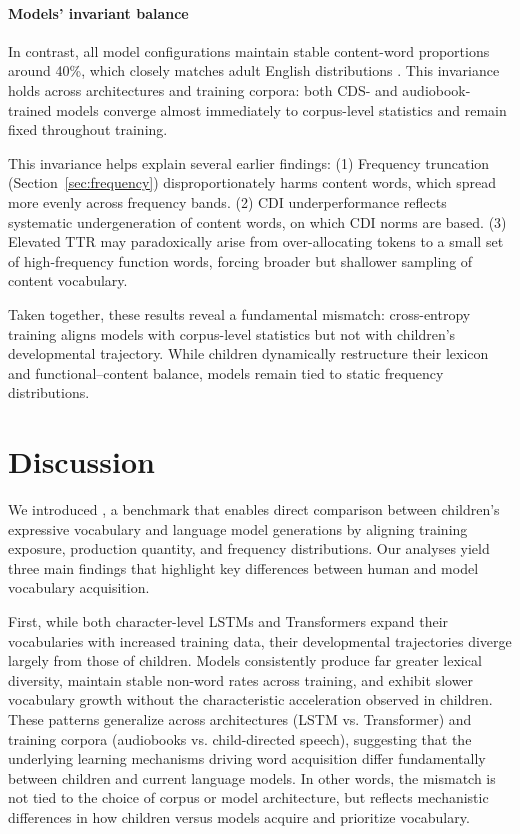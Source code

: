 \paragraph{Models’ invariant balance} 

In contrast, all model configurations maintain stable content-word proportions around 40\%, which closely matches adult English distributions \citep{biber2021grammar}. This invariance holds across architectures and training corpora: both CDS- and audiobook-trained models converge almost immediately to corpus-level statistics and remain fixed throughout training.

This invariance helps explain several earlier findings: (1) Frequency truncation (Section~\ref{sec:frequency}) disproportionately harms content words, which spread more evenly across frequency bands. (2) CDI underperformance reflects systematic undergeneration of content words, on which CDI norms are based. (3) Elevated TTR may paradoxically arise from over-allocating tokens to a small set of high-frequency function words, forcing broader but shallower sampling of content vocabulary.

Taken together, these results reveal a fundamental mismatch: cross-entropy training aligns models with corpus-level statistics but not with children’s developmental trajectory. While children dynamically restructure their lexicon and functional–content balance, models remain tied to static frequency distributions.



\section{Discussion}

We introduced \meCDI{}, a benchmark that enables direct comparison between children’s expressive vocabulary and language model generations by aligning training exposure, production quantity, and frequency distributions. Our analyses yield three main findings that highlight key differences between human and model vocabulary acquisition.


First, while both character-level LSTMs and Transformers expand their vocabularies with increased training data, their developmental trajectories diverge largely from those of children. Models consistently produce far greater lexical diversity, maintain stable non-word rates across training, and exhibit slower vocabulary growth without the characteristic acceleration observed in children. These patterns generalize across architectures (LSTM vs. Transformer) and training corpora (audiobooks vs. child-directed speech), suggesting that the underlying learning mechanisms driving word acquisition differ fundamentally between children and current language models. In other words, the mismatch is not tied to the choice of corpus or model architecture, but reflects mechanistic differences in how children versus models acquire and prioritize vocabulary.


